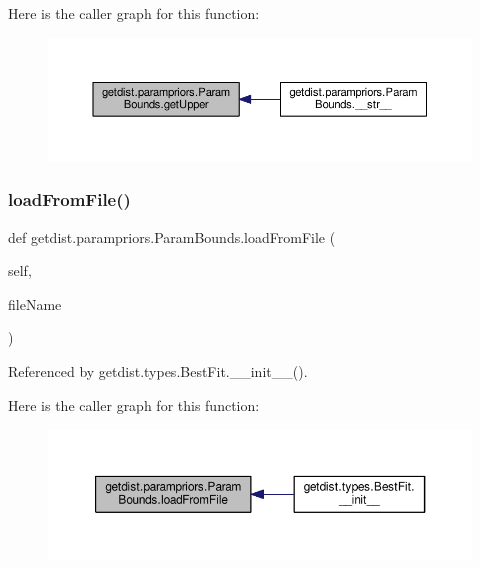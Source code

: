 Here is the caller graph for this function\+:
\nopagebreak
\begin{figure}[H]
\begin{center}
\leavevmode
\includegraphics[width=350pt]{classgetdist_1_1parampriors_1_1ParamBounds_a9b653d54efcc1d19bebd8aa0a4cb2c9a_icgraph}
\end{center}
\end{figure}
\mbox{\label{classgetdist_1_1parampriors_1_1ParamBounds_af30cba6cd32f1bd0532c223b9eb8546b}} 
\subsubsection{\texorpdfstring{load\+From\+File()}{loadFromFile()}}
{\footnotesize\ttfamily def getdist.\+parampriors.\+Param\+Bounds.\+load\+From\+File (\begin{DoxyParamCaption}\item[{}]{self,  }\item[{}]{file\+Name }\end{DoxyParamCaption})}



Referenced by getdist.\+types.\+Best\+Fit.\+\_\+\+\_\+init\+\_\+\+\_\+().

Here is the caller graph for this function\+:
\nopagebreak
\begin{figure}[H]
\begin{center}
\leavevmode
\includegraphics[width=350pt]{classgetdist_1_1parampriors_1_1ParamBounds_af30cba6cd32f1bd0532c223b9eb8546b_icgraph}
\end{center}
\end{figure}
\mbox{\label{classgetdist_1_1parampriors_1_1ParamBounds_a25ade484ee4e41ac3e8bca11acad8a48}} 
